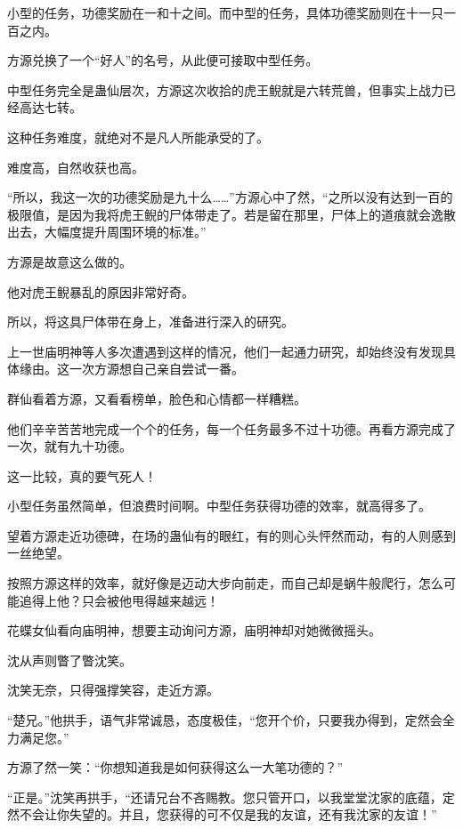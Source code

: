 
\begin{this_body}



小型的任务，功德奖励在一和十之间。而中型的任务，具体功德奖励则在十一只一百之内。

方源兑换了一个“好人”的名号，从此便可接取中型任务。

中型任务完全是蛊仙层次，方源这次收拾的虎王鲵就是六转荒兽，但事实上战力已经高达七转。

这种任务难度，就绝对不是凡人所能承受的了。

难度高，自然收获也高。

“所以，我这一次的功德奖励是九十么……”方源心中了然，“之所以没有达到一百的极限值，是因为我将虎王鲵的尸体带走了。若是留在那里，尸体上的道痕就会逸散出去，大幅度提升周围环境的标准。”

方源是故意这么做的。

他对虎王鲵暴乱的原因非常好奇。

所以，将这具尸体带在身上，准备进行深入的研究。

上一世庙明神等人多次遭遇到这样的情况，他们一起通力研究，却始终没有发现具体缘由。这一次方源想自己亲自尝试一番。

群仙看着方源，又看看榜单，脸色和心情都一样糟糕。

他们辛辛苦苦地完成一个个的任务，每一个任务最多不过十功德。再看方源完成了一次，就有九十功德。

这一比较，真的要气死人！

小型任务虽然简单，但浪费时间啊。中型任务获得功德的效率，就高得多了。

望着方源走近功德碑，在场的蛊仙有的眼红，有的则心头怦然而动，有的人则感到一丝绝望。

按照方源这样的效率，就好像是迈动大步向前走，而自己却是蜗牛般爬行，怎么可能追得上他？只会被他甩得越来越远！

花蝶女仙看向庙明神，想要主动询问方源，庙明神却对她微微摇头。

沈从声则瞥了瞥沈笑。

沈笑无奈，只得强撑笑容，走近方源。

“楚兄。”他拱手，语气非常诚恳，态度极佳，“您开个价，只要我办得到，定然会全力满足您。”

方源了然一笑：“你想知道我是如何获得这么一大笔功德的？”

“正是。”沈笑再拱手，“还请兄台不吝赐教。您只管开口，以我堂堂沈家的底蕴，定然不会让你失望的。并且，您获得的可不仅是我的友谊，还有我沈家的友谊！”


\end{this_body}
